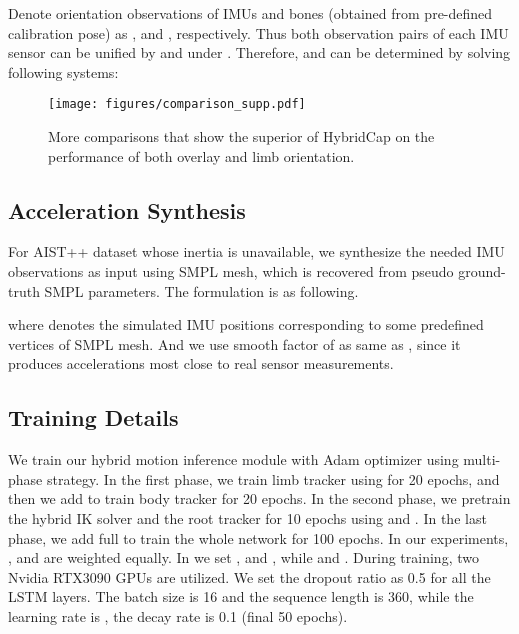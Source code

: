 \documentclass[letterpaper]{article} \usepackage{aaai23}  \usepackage{times}  \usepackage{helvet}  \usepackage{courier}  \usepackage[hyphens]{url}  \usepackage{graphicx} \urlstyle{rm} \def\UrlFont{\rm}  \usepackage{natbib}  \usepackage{caption} \frenchspacing  \setlength{\pdfpagewidth}{8.5in}  \setlength{\pdfpageheight}{11in}  \usepackage{algorithm}
\begin{document}
Denote orientation observations of IMUs and bones (obtained from pre-defined calibration pose) as ,  and ,  respectively. Thus both observation pairs of each IMU sensor can be unified by  and  under . Therefore,  and  can be determined by solving following systems:






\begin{figure*}[t]
	\centering
	\texttt{[image: figures/comparison\_supp.pdf]}
	\caption{More comparisons that show the superior of HybridCap on the performance of both overlay and limb orientation.}
	\label{fig:comp}
	\vspace{-2mm}
\end{figure*}


\vspace{-2mm}
\subsection{Acceleration Synthesis}
For AIST++ \cite{li2021learn, aist-dance-db} dataset whose inertia is unavailable, we synthesize the needed IMU observations as input using SMPL \cite{SMPL2015} mesh, which is recovered from pseudo ground-truth SMPL parameters. The formulation is as following. 

where  denotes the simulated IMU positions corresponding to some predefined vertices of SMPL mesh.
And we use smooth factor of  as same as \cite{TransPose2021}, since it produces accelerations most close to real sensor measurements. 

\vspace{-2mm}
\subsection{Training Details}

We train our hybrid motion inference module with Adam optimizer \cite{kingma2014adam} using multi-phase strategy. In the first phase, we train limb tracker using  for 20 epochs, and then we add  to train body tracker for 20 epochs. In the second phase, we pretrain the hybrid IK solver and the root tracker for 10 epochs using  and . In the last phase, we add full  to train the whole network for 100 epochs. 
In our experiments, ,  and  are weighted equally. In  we set ,  and , while  and .
During training, two Nvidia RTX3090 GPUs are utilized. We set the dropout ratio as 0.5 for all the LSTM layers. The batch size is 16 and the sequence length is 360, while the learning rate is , the decay rate is 0.1 (final 50 epochs). 
\end{document}
